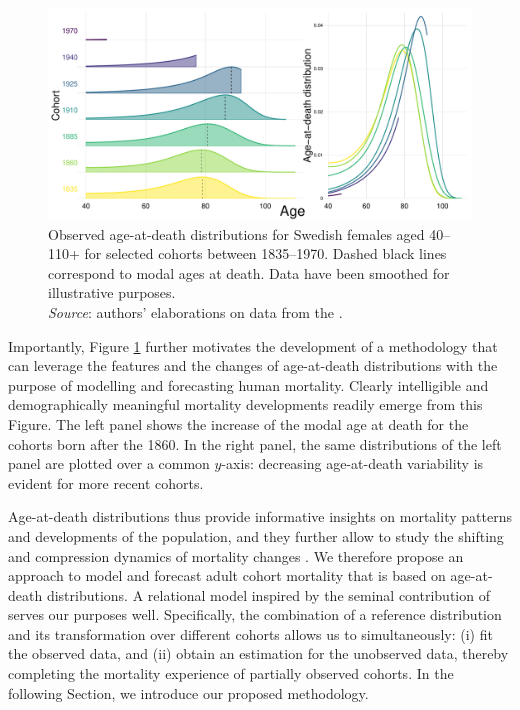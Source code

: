 \documentclass[11pt, a4paper]{article}
\begin{document}
{\begin{figure}[t]
	\begin{center}
		\includegraphics[scale=0.60]{./Figures/F1.pdf}
		\caption{{\color{red}Observed age-at-death distributions for Swedish females aged 40--110+ for selected cohorts between 1835--1970. Dashed black lines correspond to modal ages at death. Data have been smoothed for illustrative purposes. \\ \small \textit{Source}: authors' elaborations on data from the \cite{HMD}.}}\label{Fig:ADDcohort}	
	\end{center}
\end{figure}

Importantly, Figure \ref{Fig:ADDcohort} further motivates the development of a methodology that can leverage the features and the changes of age-at-death distributions with the purpose of modelling and forecasting human mortality. Clearly intelligible and demographically meaningful mortality developments readily emerge from this Figure. The left panel shows the increase of the modal age at death for the cohorts born after the 1860. In the right panel, the same distributions of the left panel are plotted over a common $y$-axis: decreasing age-at-death variability is evident for more recent cohorts.

Age-at-death distributions thus provide informative insights on mortality patterns and developments of the population, and they further allow to study the shifting and compression dynamics of mortality changes \cite[see, e.g.,][]{fries1980aging,kannisto2001mode,bongaarts2005long,janssen2019timing}. We therefore propose an approach to model and forecast adult cohort mortality that is based on age-at-death distributions. A relational model inspired by the seminal contribution of \cite{brass1971scale} serves our purposes well. Specifically, the combination of a reference distribution and its transformation over different cohorts allows us to simultaneously: (i) fit the observed data, and (ii) obtain an estimation for the unobserved data, thereby completing the mortality experience of partially observed cohorts. In the following Section, we introduce our proposed methodology.  

}
\end{document}
